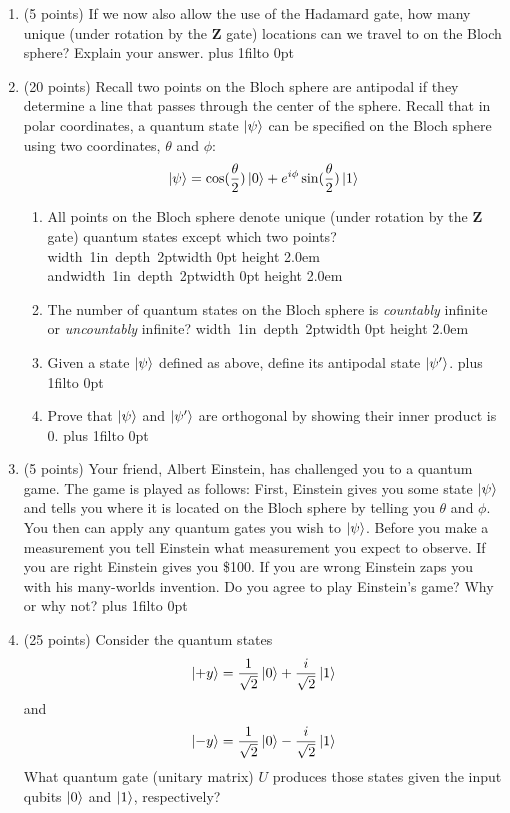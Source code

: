 \documentclass[12pt]{article}
\newcommand{\Blank}{\mbox{\hskip 4pt\vrule width 1in depth 2pt}\vrule width 0pt height 2.0em}
\def\DefaultSpace{1in}
\newcommand{\LeaveSpace}[1][\DefaultSpace]{%
\vskip #1 plus 1fil\relax\hbox to 0pt{\hss} %
}
\begin{document}
\begin{enumerate}[font=\bfseries]
    \item (5 points) If we now also allow the use of the Hadamard gate, how many unique (under rotation by the $\mathbf{Z}$ gate) locations can we travel to on the Bloch sphere? Explain your answer. \LeaveSpace{}
    \newpage
    \item (20 points) Recall two points on the Bloch sphere are antipodal if they determine a line that passes through the center of the sphere. Recall that in polar coordinates, a quantum state $\ket{\psi}$ can be specified on the Bloch sphere using two coordinates, $\theta$ and $\phi$:
    \[\ket{\psi} = \cos(\frac{\theta}{2})\ket{0}
    + e^{i\phi}\sin(\frac{\theta}{2})\ket{1}\]
    \begin{enumerate}
        \item All points on the Bloch sphere denote unique (under rotation by the $\mathbf{Z}$ gate) quantum states except which two points? \Blank{} and\Blank{}
        \item The number of quantum states on the Bloch sphere is \emph{countably} infinite or \emph{uncountably} infinite? \Blank{}
        \item Given a state $\ket{\psi}$ defined as above, define its antipodal state $\ket{\psi'}$. \LeaveSpace{}
        \item Prove that $\ket{\psi}$ and $\ket{\psi'}$ are orthogonal by showing their inner product is 0. \LeaveSpace[2.0in]
    \end{enumerate}
    \newpage
    \item (5 points) Your friend, Albert Einstein, has challenged you to a quantum game. The game is played as follows: First, Einstein gives you some state $\ket{\psi}$ and tells you where it is located on the Bloch sphere by telling you $\theta$ and $\phi$. You then can apply any quantum gates you wish to $\ket{\psi}$. Before you make a measurement you tell Einstein what measurement you expect to observe. If you are right Einstein gives you \$100. If you are wrong Einstein zaps you with his many-worlds invention. Do you agree to play Einstein's game? Why or why not? \LeaveSpace{}
    \item (25 points) Consider the quantum states
        \[\ket{+y} = \frac{1}{\sqrt{2}}\ket{0} + \frac{i}{\sqrt{2}}\ket{1}\]
        and
        \[\ket{-y} = \frac{1}{\sqrt{2}}\ket{0} - \frac{i}{\sqrt{2}}\ket{1}\]
        What quantum gate (unitary matrix) $U$ produces those states given the input qubits $\ket{0}$ and $\ket{1}$, respectively?
        \begin{enumerate}

\end{enumerate}
\end{enumerate}
\end{document}
